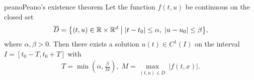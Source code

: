 \begin{Theorem*}{peano}{Peano's existence theorem}
  \label{satz:peano}
  Let the function $f(t,u)$ be continuous on the closed set
  \begin{gather*}
    \overline D =\bigl\{
    (t,u) \in \mathbb R\times\mathbb R^d \;\big|
    \;|t-t_0| \le \alpha,\;
    |u-u_0|\le\beta
    \bigr\},
  \end{gather*}
  where $\alpha,\beta>0$. Then there exists a solution
    $u(t) \in C^1(I)$
  on the interval
    $I=[t_0-T,t_0+T]$
  with
  \begin{gather*}
    T=\min\left(\alpha ,\frac{\beta}{M}\right),\;
    M=\max_{(t,u)\in \overline D} \ |f(t,x)|.
  \end{gather*}
\end{Theorem*}
